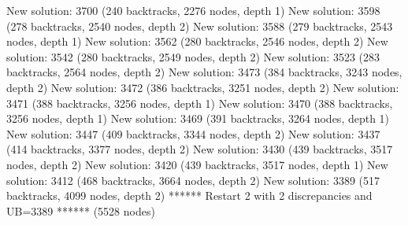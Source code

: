 \begin{enumerate}
{\begin{DoxyCode}
New solution: 3700 (240 backtracks, 2276 nodes, depth 1)
New solution: 3598 (278 backtracks, 2540 nodes, depth 2)
New solution: 3588 (279 backtracks, 2543 nodes, depth 1)
New solution: 3562 (280 backtracks, 2546 nodes, depth 2)
New solution: 3542 (280 backtracks, 2549 nodes, depth 2)
New solution: 3523 (283 backtracks, 2564 nodes, depth 2)
New solution: 3473 (384 backtracks, 3243 nodes, depth 2)
New solution: 3472 (386 backtracks, 3251 nodes, depth 2)
New solution: 3471 (388 backtracks, 3256 nodes, depth 1)
New solution: 3470 (388 backtracks, 3256 nodes, depth 1)
New solution: 3469 (391 backtracks, 3264 nodes, depth 1)
New solution: 3447 (409 backtracks, 3344 nodes, depth 2)
New solution: 3437 (414 backtracks, 3377 nodes, depth 2)
New solution: 3430 (439 backtracks, 3517 nodes, depth 2)
New solution: 3420 (439 backtracks, 3517 nodes, depth 1)
New solution: 3412 (468 backtracks, 3664 nodes, depth 2)
New solution: 3389 (517 backtracks, 4099 nodes, depth 2)
****** Restart 2 with 2 discrepancies and UB=3389 ****** (5528 nodes)


\end{DoxyCode}}
\end{enumerate}
